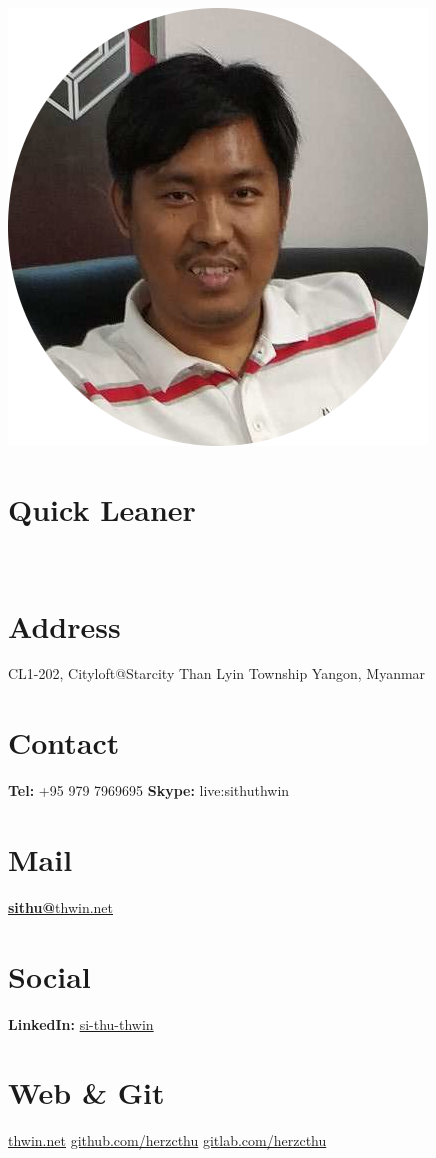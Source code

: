 \documentclass[]{friggeri-cv}
\begin{document}
\begin{aside}
  \includegraphics[scale=1]{img/myself-circle.png}
  \section{Quick Leaner}
    ~
  \section{Address}
    CL1-202, Cityloft@Starcity
    Than Lyin Township
    Yangon, Myanmar
    ~
  \section{Contact}
    \textbf{Tel:} +95 979 7969695
    \textbf{Skype:} live:sithuthwin
    ~
  \section{Mail}
    \href{mailto:sithu@thwin.net}{\textbf{sithu@}thwin.net}
    ~
  \section{Social}
    \textbf{LinkedIn:} \href{https://www.linkedin.com/in/si-thu-thwin/}{si-thu-thwin}
    ~
  \section{Web \& Git}
    \href{https://www.thwin.net}{thwin.net}
    \href{https://github.com/herzcthu}{github.com/herzcthu}
    \href{https://gitlab.com/herzcthu}{gitlab.com/herzcthu}
    ~

\end{aside}
\end{document}
